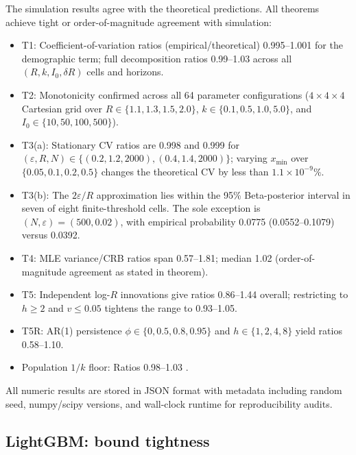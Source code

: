 \documentclass[review]{elsarticle}
\theoremstyle{plain}
\theoremstyle{definition}
\begin{document}
The simulation results agree with the theoretical predictions. All theorems achieve tight or order-of-magnitude agreement with simulation:
\begin{itemize}
\item T1: Coefficient-of-variation ratios (empirical/theoretical) 0.995--1.001 for the demographic term; full decomposition ratios 0.99--1.03 across all $(R, k, I_0, \delta R)$ cells and horizons.
\item T2: Monotonicity confirmed across all 64 parameter configurations ($4 \times 4 \times 4$ Cartesian grid over $R \in \{1.1, 1.3, 1.5, 2.0\}$, $k \in \{0.1, 0.5, 1.0, 5.0\}$, and $I_0 \in \{10, 50, 100, 500\}$).
\item T3(a): Stationary CV ratios are 0.998 and 0.999 for $(\varepsilon,R,N)\in\{(0.2,1.2,2000),(0.4,1.4,2000)\}$; varying $x_{\min}$ over $\{0.05,0.1,0.2,0.5\}$ changes the theoretical CV by less than $1.1\times10^{-9}\%$.
\item T3(b): The $2\varepsilon/R$ approximation lies within the 95\% Beta-posterior interval in seven of eight finite-threshold cells. The sole exception is $(N,\varepsilon)=(500,0.02)$, with empirical probability 0.0775 (0.0552--0.1079) versus 0.0392.
\item T4: MLE variance/CRB ratios span 0.57--1.81; median 1.02 (order-of-magnitude agreement as stated in theorem).
\item T5: Independent log-$R$ innovations give ratios 0.86--1.44 overall; restricting to $h \geq 2$ and $v \leq 0.05$ tightens the range to 0.93--1.05.
\item T5R: AR(1) persistence $\phi \in \{0, 0.5, 0.8, 0.95\}$ and $h \in \{1, 2, 4, 8\}$ yield ratios 0.58--1.10.
\item Population $1/k$ floor: Ratios 0.98--1.03 .
\end{itemize}

All numeric results are stored in JSON format with metadata including random seed, numpy/scipy versions, and wall-clock runtime for reproducibility audits.




\subsection{LightGBM: bound tightness}\label{sec:ml}
\end{document}
